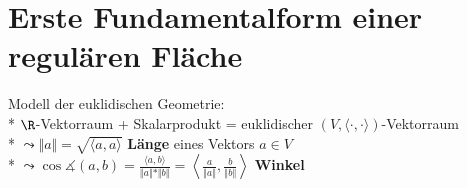 \section{Erste Fundamentalform einer regulären Fläche}

\begin{remark}[Erinnerung an LA]
  Modell der euklidischen Geometrie: \\*
  \( \R \)-Vektorraum + Skalarprodukt = euklidischer \( (V, \langle \cdot, \cdot \rangle) \)-Vektorraum \\*
  \( \leadsto \Vert a \Vert = \sqrt{\langle a, a \rangle} \) \textbf{Länge} eines Vektors \( a \in V \) \\*
  \( \leadsto \cos \measuredangle(a,b) = \frac{\langle a, b \rangle}{\Vert a \Vert*\Vert b \Vert} = \left\langle \frac{a}{\Vert a \Vert}, \frac{b}{\Vert b \Vert} \right\rangle \) \textbf{Winkel} \\
\end{remark}

